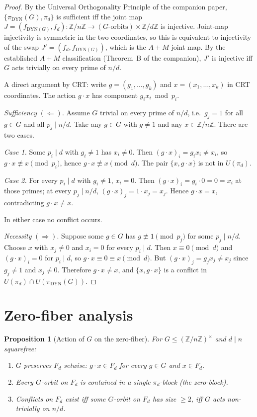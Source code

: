 \documentclass[11pt,reqno]{amsart}
\theoremstyle{plain}
\newtheorem{proposition}[theorem]{Proposition}
\theoremstyle{definition}
\newcommand{\Z}{\mathbb{Z}}
\newcommand{\Zn}{\Z/n\Z}
\newcommand{\Zns}{(\Z/n\Z)^{\times}}
\newcommand{\DYN}{\mathrm{DYN}}
\begin{document}
\begin{proof}
By the Universal Orthogonality Principle of the companion paper, $\{\pi_{\DYN}(G), \pi_d\}$ is sufficient iff the joint map $J = (f_{\DYN(G)}, f_d) \colon \Zn \to (\text{$G$-orbits}) \times \Z/d\Z$ is injective. Joint-map injectivity is symmetric in the two coordinates, so this is equivalent to injectivity of the swap $J' = (f_d, f_{\DYN(G)})$, which is the $A{+}M$ joint map. By the established $A{+}M$ classification (Theorem~B of the companion), $J'$ is injective iff $G$ acts trivially on every prime of $n/d$.

A direct argument by CRT: write $g = (g_1,\ldots,g_k)$ and $x = (x_1,\ldots,x_k)$ in CRT coordinates. The action $g \cdot x$ has component $g_i x_i \bmod p_i$.

\emph{Sufficiency} $(\Leftarrow)$. Assume $G$ trivial on every prime of $n/d$, i.e.\ $g_j = 1$ for all $g \in G$ and all $p_j \mid n/d$. Take any $g \in G$ with $g \neq 1$ and any $x \in \Zn$. There are two cases.

\emph{Case 1.} Some $p_i \mid d$ with $g_i \neq 1$ has $x_i \neq 0$. Then $(g \cdot x)_i = g_i x_i \neq x_i$, so $g \cdot x \not\equiv x \pmod{p_i}$, hence $g \cdot x \not\equiv x \pmod d$. The pair $\{x, g \cdot x\}$ is not in $U(\pi_d)$.

\emph{Case 2.} For every $p_i \mid d$ with $g_i \neq 1$, $x_i = 0$. Then $(g \cdot x)_i = g_i \cdot 0 = 0 = x_i$ at those primes; at every $p_j \mid n/d$, $(g \cdot x)_j = 1 \cdot x_j = x_j$. Hence $g \cdot x = x$, contradicting $g \cdot x \neq x$.

In either case no conflict occurs.

\emph{Necessity} $(\Rightarrow)$. Suppose some $g \in G$ has $g \not\equiv 1 \pmod{p_j}$ for some $p_j \mid n/d$. Choose $x$ with $x_j \neq 0$ and $x_i = 0$ for every $p_i \mid d$. Then $x \equiv 0 \pmod d$ and $(g \cdot x)_i = 0$ for $p_i \mid d$, so $g \cdot x \equiv 0 \equiv x \pmod d$. But $(g \cdot x)_j = g_j x_j \neq x_j$ since $g_j \neq 1$ and $x_j \neq 0$. Therefore $g \cdot x \neq x$, and $\{x, g \cdot x\}$ is a conflict in $U(\pi_d) \cap U(\pi_{\DYN}(G))$.
\end{proof}

\section{Zero-fiber analysis}

\begin{proposition}[Action of $G$ on the zero-fiber]\label{prop:zerofiber}
For $G \leq \Zns$ and $d \mid n$ squarefree:
\begin{enumerate}[label=(\alph*)]
\item $G$ preserves $F_d$ setwise: $g \cdot x \in F_d$ for every $g \in G$ and $x \in F_d$.
\item Every $G$-orbit on $F_d$ is contained in a single $\pi_d$-block (the zero-block).
\item Conflicts on $F_d$ exist iff some $G$-orbit on $F_d$ has size $\geq 2$, iff $G$ acts non-trivially on $n/d$.
\end{enumerate}
\end{proposition}
\end{document}
